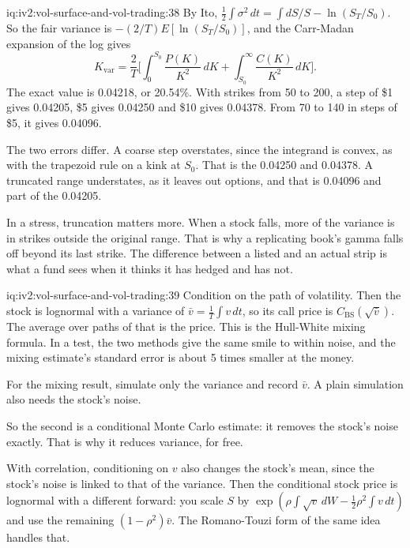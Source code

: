 \begin{solution}{iq:iv2:vol-surface-and-vol-trading:38}
By Ito, $\tfrac12\int\sigma^2\,dt = \int dS/S - \ln(S_T/S_0)$. So the fair variance is $-(2/T)E[\ln(S_T/S_0)]$, and the Carr-Madan expansion of the log gives
\[
K_{\text{var}} = \frac2T\Big[\int_0^{S_0}\frac{P(K)}{K^2}\,dK + \int_{S_0}^\infty\frac{C(K)}{K^2}\,dK\Big].
\]
The exact value is 0.04218, or 20.54\%. With strikes from 50 to 200, a step of \$1 gives 0.04205, \$5 gives 0.04250 and \$10 gives 0.04378. From 70 to 140 in steps of \$5, it gives 0.04096.

The two errors differ. A coarse step overstates, since the integrand is convex, as with the trapezoid rule on a kink at $S_0$. That is the 0.04250 and 0.04378. A truncated range understates, as it leaves out options, and that is 0.04096 and part of the 0.04205.

In a stress, truncation matters more. When a stock falls, more of the variance is in strikes outside the original range. That is why a replicating book's gamma falls off beyond its last strike. The difference between a listed and an actual strip is what a fund sees when it thinks it has hedged and has not.

\end{solution}

\begin{solution}{iq:iv2:vol-surface-and-vol-trading:39}
Condition on the path of volatility. Then the stock is lognormal with a variance of $\bar v = \frac1T\int v\,dt$, so its call price is $C_{\text{BS}}(\sqrt{\bar v})$. The average over paths of that is the price. This is the Hull-White mixing formula. In a test, the two methods give the same smile to within noise, and the mixing estimate's standard error is about 5 times smaller at the money.

For the mixing result, simulate only the variance and record $\bar v$. A plain simulation also needs the stock's noise.

So the second is a conditional Monte Carlo estimate: it removes the stock's noise exactly. That is why it reduces variance, for free.

With correlation, conditioning on $v$ also changes the stock's mean, since the stock's noise is linked to that of the variance. Then the conditional stock price is lognormal with a different forward: you scale $S$ by $\exp(\rho\int\sqrt v\,dW - \tfrac12\rho^2\int v\,dt)$ and use the remaining $(1 - \rho^2)\bar v$. The Romano-Touzi form of the same idea handles that.

\end{solution}

